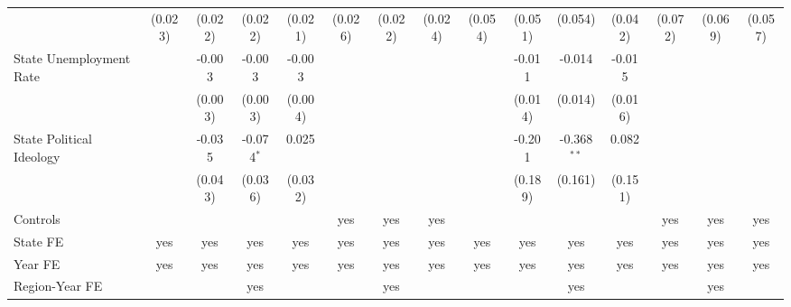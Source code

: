 \documentclass[
]{article}
\begin{document}
\begin{landscape}
\begin{table}[htbp]
\begin{adjustbox}{width = 1.5\textwidth, center}
\begin{threeparttable}[b]
\begin{tabular}{lcccccccccccccc}
                                                      & (0.023)        & (0.022)        & (0.022)        & (0.021)        & (0.026)       & (0.022)       & (0.024)       & (0.054)        & (0.051)        & (0.054)        & (0.042)        & (0.072)       & (0.069)       & (0.057)\\   
            State Unemployment Rate                   &                & -0.003         & -0.003         & -0.003         &               &               &               &                & -0.011         & -0.014         & -0.015         &               &               &   \\   
                                                      &                & (0.003)        & (0.003)        & (0.004)        &               &               &               &                & (0.014)        & (0.014)        & (0.016)        &               &               &   \\   
            State Political Ideology                  &                & -0.035         & -0.074$^{*}$   & 0.025          &               &               &               &                & -0.201         & -0.368$^{**}$  & 0.082          &               &               &   \\   
                                                      &                & (0.043)        & (0.036)        & (0.032)        &               &               &               &                & (0.189)        & (0.161)        & (0.151)        &               &               &   \\   
            \midrule 
            Controls                                  &                &                &                &                & yes           & yes           & yes           &                &                &                &                & yes           & yes           & yes\\  
            State FE                                  & yes            & yes            & yes            & yes            & yes           & yes           & yes           & yes            & yes            & yes            & yes            & yes           & yes           & yes\\  
            Year FE                                   & yes            & yes            & yes            & yes            & yes           & yes           & yes           & yes            & yes            & yes            & yes            & yes           & yes           & yes\\  
            Region-Year FE                            &                &                & yes            &                &               & yes           &               &                &                & yes            &                &               & yes           & \\  

\end{tabular}
\end{threeparttable}
\end{adjustbox}
\end{table}
\end{landscape}
\end{document}
